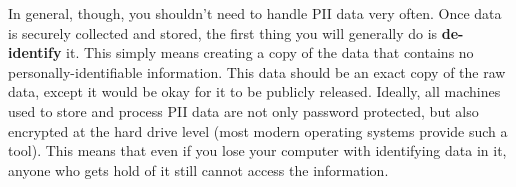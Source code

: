 In general, though, you shouldn't need to handle PII data very often.
Once data is securely collected and stored, the first thing you will generally do is \textbf{de-identify} it.
This simply means creating a copy of the data that contains no personally-identifiable information.
This data should be an exact copy of the raw data,
except it would be okay for it to be publicly released.\cite{matthews2011data}
Ideally, all machines used to store and process PII data are not only password protected, but also encrypted at the hard drive level
(most modern operating systems provide such a tool).
This means that even if you lose your computer with identifying data in it,
anyone who gets hold of it still cannot access the information.
